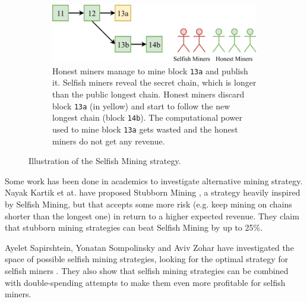 \begin{figure}[h]
\begin{subfigure}{\textwidth}
		\includegraphics[scale=0.9]{figures/selfish_3}
		\vspace*{0.25cm}
		\caption{
			Honest miners manage to mine block \texttt{13a} and publish it.
			Selfish miners reveal the secret chain, which is longer than the public longest chain.
			Honest miners discard block \texttt{13a} (in yellow) and start to follow the new longest chain (block \texttt{14b}).
			The computational power used to mine block \texttt{13a} gets wasted and the honest miners do not get any revenue.
		}
		\vspace*{0.25cm}
	\end{subfigure}
	\caption{Illustration of the Selfish Mining strategy.}
	\label{fig:selfish-mining}
\end{figure}

\bigskip
Some work has been done in academics to investigate alternative mining strategy.
Nayak Kartik et at. have proposed Stubborn Mining \cite{stubborn_mining_2016}, a strategy heavily inspired by Selfish Mining, but that accepts some more risk (e.g. keep mining on chains shorter than the longest one) in return to a higher expected revenue.
They claim that stubborn mining strategies can beat Selfish Mining by up to \num{25}\%.

Ayelet Sapirshtein, Yonatan Sompolinsky and Aviv Zohar have investigated the space of possible selfish mining strategies, looking for the optimal strategy for selfish miners \cite{optimal_selfish_mining_2016}.
They also show that selfish mining strategies can be combined with double-spending attempts to make them even more profitable for selfish miners.
